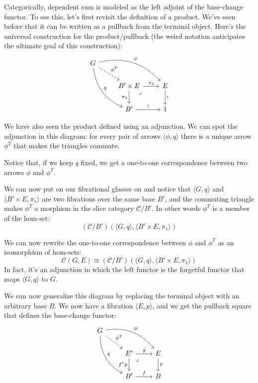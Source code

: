 \documentclass[DaoFP]{subfiles}
\begin{document}
Categorically, dependent sum is modeled as the left adjoint of the base-change functor. To see this, let's first revisit the definition of a product. We've seen before that it can be written as a pullback from the terminal object. Here's the universal construction for the product/pullback (the weird notation anticipates the ultimate goal of this construction):
\[
 \begin{tikzcd}
 G
 \arrow[dr, dashed, "\phi^T"]
 \arrow[drr, bend left, "\phi"]
 \arrow[ddr, bend right, "q"]
 \\
 &B' \times E
\arrow[dr, phantom,  , very near start, "\lrcorner"]
 \arrow[r, "\pi_2"]
 \arrow[d, "\pi_1"']
 &E
 \arrow[d, "!"]
 \\
 &B'
 \arrow[r, "!"]
 &1
  \end{tikzcd}
\]

We have also seen the product defined using an adjunction. We can spot the adjunction in this diagram: for every pair of arrows $\langle \phi, q \rangle$ there is a unique arrow $\phi^T$ that makes the triangles commute. 

Notice that, if we keep $q$ fixed, we get a one-to-one correspondence between two arrows $\phi$ and $\phi^T$. 

We can now put on our fibrational glasses on and notice that $\langle G, q\rangle$ and $\langle B' \times E, \pi_1 \rangle$ are two fibrations over the same base $B'$, and the commuting triangle makes $\phi^T$ a morphism in the slice category $\mathcal{C}/B'$. In other words $\phi^T$ is a member of the hom-set:
 \[ (\mathcal{C}/B')(\langle G, q \rangle, \langle B' \times E, \pi_1 \rangle)  \]
 
 We can now rewrite the one-to-one correspondence between $\phi$ and $\phi^T$ as an isomorphism of hom-sets:
\[ \mathcal{C}(G, E) \cong  (\mathcal{C}/B')(\langle G, q \rangle, \langle B' \times E, \pi_1 \rangle)\]
In fact, it's an adjunction in which the left functor is the forgetful functor that maps $\langle G, q \rangle$ to $G$.

We can now generalize this diagram by replacing the terminal object with an arbitrary base $B$. We now have a fibration $\langle E, p \rangle$, and we get the pullback square that defines the base-change functor:
\[
 \begin{tikzcd}
 G
 \arrow[dr, dashed, "\phi^T"]
 \arrow[drr, bend left, "\phi"]
 \arrow[ddr, bend right, "q"]
 \\
 &E'
\arrow[dr, phantom,  , very near start, "\lrcorner"]
 \arrow[r, "g"]
 \arrow[d, "f^* p"']
 &E
 \arrow[d, "p"]
 \\
 &B'
 \arrow[r, "f"]
 &B
  \end{tikzcd}
\]
\end{document}
